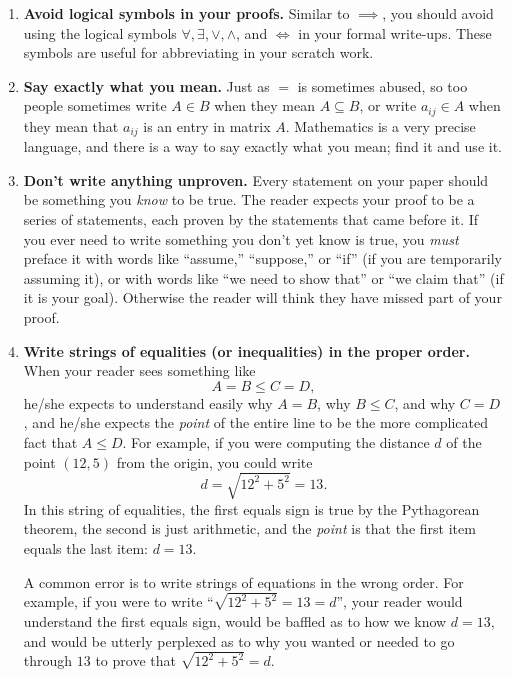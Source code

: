 \begin{enumerate}
\item \textbf{Avoid logical symbols in your proofs.}  Similar to $\implies$, you should avoid using the logical symbols $\forall, \exists, \vee, \wedge$, and $\iff$ in your formal write-ups.  These symbols are useful for abbreviating in your scratch work. 

\item \textbf{Say exactly what you mean.}
        Just as $=$ is sometimes abused,
        so too people sometimes write $A\in B$ when they mean $A\subseteq B$,
        or write $a_{ij}\in A$ when they mean that $a_{ij}$ is an entry in matrix $A$.
        Mathematics is a very precise language, and there is a way to say exactly what you mean;
        find it and use it.

\item \textbf{Don't write anything unproven.}
        Every statement on your paper should be something you \emph{know} to be true.
        The reader expects your proof to be a series of statements, each proven by the statements that came before it.
        If you ever need to write something you don't yet know is true,
        you \emph{must} preface it with words like ``assume,'' ``suppose,'' or ``if''
        (if you are temporarily assuming it),
        or with words like ``we need to show that'' or ``we claim that'' (if it is your goal).
        Otherwise the reader will think they have missed part of your proof.

\item \textbf{Write strings of equalities (or inequalities) in the proper order.}
        When your reader sees something like
        $$A=B\leq C=D,$$
        he/she expects to understand easily why $A=B$, why $B\leq C$, and why $C=D$,
        and he/she expects the \emph{point} of the entire line to be the more complicated fact that $A\leq D$.
        For example, if you were computing the distance $d$ of the point $(12,5)$ from the origin,
        you could write
        $$d = \sqrt{12^2+5^2} = 13.$$
        In this string of equalities, the first equals sign is true by the Pythagorean theorem, 
        the second is just arithmetic, and the \emph{point} is that the first item equals the last item: $d=13$.
        
        A common error is to write strings of equations in the wrong order.
        For example, if you were to write ``$\sqrt{12^2+5^2}=13=d$'',
        your reader would understand the first equals sign,
        would be baffled as to how we know $d=13$,
        and would be utterly perplexed as to why you wanted or needed to go through $13$ to prove that $\sqrt{12^2+5^2}=d$.


\end{enumerate}
